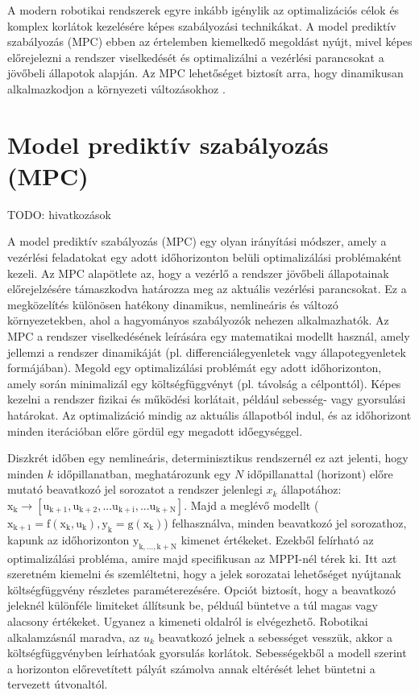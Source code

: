 A modern robotikai rendszerek egyre inkább igénylik az optimalizációs célok és komplex korlátok kezelésére képes szabályozási technikákat. A model prediktív szabályozás (MPC) ebben az értelemben kiemelkedő megoldást nyújt, mivel képes előrejelezni a rendszer viselkedését és optimalizálni a vezérlési parancsokat a jövőbeli állapotok alapján. Az MPC lehetőséget biztosít arra, hogy dinamikusan alkalmazkodjon a környezeti változásokhoz \cite{rawlings_model}.

\section{Model prediktív szabályozás (MPC)}
TODO: hivatkozások

A model prediktív szabályozás (MPC) egy olyan irányítási módszer, amely a vezérlési feladatokat egy adott időhorizonton belüli optimalizálási problémaként kezeli. Az MPC alapötlete az, hogy a vezérlő a rendszer jövőbeli állapotainak előrejelzésére támaszkodva határozza meg az aktuális vezérlési parancsokat. Ez a megközelítés különösen hatékony dinamikus, nemlineáris és változó környezetekben, ahol a hagyományos szabályozók nehezen alkalmazhatók. Az MPC a rendszer viselkedésének leírására egy matematikai modellt használ, amely jellemzi a rendszer dinamikáját (pl. differenciálegyenletek vagy állapotegyenletek formájában). Megold egy optimalizálási problémát egy adott időhorizonton, amely során minimalizál egy költségfüggvényt (pl. távolság a célponttól). Képes kezelni a rendszer fizikai és működési korlátait, például sebesség- vagy gyorsulási határokat. Az optimalizáció mindig az aktuális állapotból indul, és az időhorizont minden iterációban előre gördül egy megadott időegységgel.

Diszkrét időben egy nemlineáris, determinisztikus rendszernél ez azt jelenti, hogy minden $k$ időpillanatban, meghatározunk egy $N$ időpillanattal (horizont) előre mutató beavatkozó jel sorozatot a rendszer jelenlegi $x_k$ állapotához: $\mathrm{x_k \rightarrow [u_{k+1}, u_{k+2}, ... u_{k+i}, ... u_{k+N}]}$. Majd a meglévő modellt ($\mathrm{x_{k+1} = f(x_k, u_k), y_k = g(x_k)}$) felhasználva, minden beavatkozó jel sorozathoz, kapunk az időhorizonton $\mathrm{y_{k,...,k+N}}$ kimenet értékeket. Ezekből felírható az optimalizálási probléma, amire majd specifikusan az MPPI-nél térek ki. Itt azt szeretném kiemelni és szemléltetni, hogy a jelek sorozatai lehetőséget nyújtanak költségfüggvény részletes paraméterezésére. Opciót biztosít, hogy a beavatkozó jeleknél különféle limiteket állítsunk be, példuál büntetve a túl magas vagy alacsony értékeket. Ugyanez a kimeneti oldalról is elvégezhető. Robotikai alkalamzásnál maradva, az $u_k$ beavatkozó jelnek a sebességet vesszük, akkor a költségfüggvényben leírhatóak gyorsulás korlátok. Sebességekből a modell szerint a horizonton előrevetített pályát számolva annak eltérését lehet büntetni a tervezett útvonaltól.

